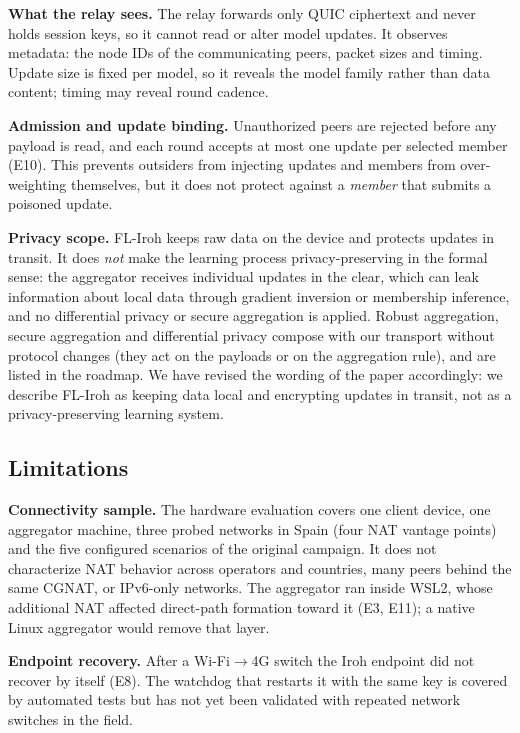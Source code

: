\textbf{What the relay sees.} The relay forwards only QUIC ciphertext and never holds session keys, so it cannot read or alter model updates. It observes metadata: the node IDs of the communicating peers, packet sizes and timing. Update size is fixed per model, so it reveals the model family rather than data content; timing may reveal round cadence.

\textbf{Admission and update binding.} Unauthorized peers are rejected before any payload is read, and each round accepts at most one update per selected member (E10). This prevents outsiders from injecting updates and members from over-weighting themselves, but it does not protect against a \emph{member} that submits a poisoned update.

\textbf{Privacy scope.} FL-Iroh keeps raw data on the device and protects updates in transit. It does \emph{not} make the learning process privacy-preserving in the formal sense: the aggregator receives individual updates in the clear, which can leak information about local data through gradient inversion or membership inference, and no differential privacy or secure aggregation is applied. Robust aggregation, secure aggregation and differential privacy compose with our transport without protocol changes (they act on the payloads or on the aggregation rule), and are listed in the roadmap. We have revised the wording of the paper accordingly: we describe FL-Iroh as keeping data local and encrypting updates in transit, not as a privacy-preserving learning system.

\subsection{Limitations}
\label{sec:limitations}

\textbf{Connectivity sample.} The hardware evaluation covers one client device, one aggregator machine, three probed networks in Spain (four NAT vantage points) and the five configured scenarios of the original campaign. It does not characterize NAT behavior across operators and countries, many peers behind the same CGNAT, or IPv6-only networks. The aggregator ran inside WSL2, whose additional NAT affected direct-path formation toward it (E3, E11); a native Linux aggregator would remove that layer.

\textbf{Endpoint recovery.} After a Wi-Fi$\to$4G switch the Iroh endpoint did not recover by itself (E8). The watchdog that restarts it with the same key is covered by automated tests but has not yet been validated with repeated network switches in the field.


